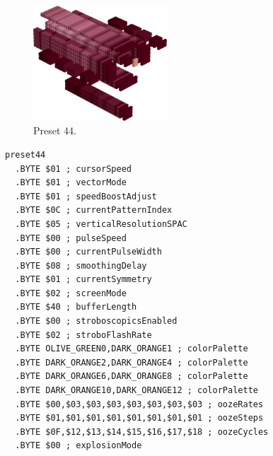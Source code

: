 \vspace*{-0.5cm}
\begin{minipage}[b]{0.48\linewidth}
\begin{figure}[H]                                                          
  \centering                                                             
  \begin{adjustbox}{width=5cm,center}                                   
  \includegraphics[width=5cm]{src/colorspace_presets/preset44-45.png}%
  \end{adjustbox}                                                        
\caption*{Preset 44.}                                           
\end{figure}                                                               
\end{minipage}
\hspace{0.1cm}
\begin{minipage}[b]{0.48\linewidth}                                                                         
\begin{lstlisting}[basicstyle=\ttfamily\tiny]
preset44
  .BYTE $01 ; cursorSpeed
  .BYTE $01 ; vectorMode
  .BYTE $01 ; speedBoostAdjust
  .BYTE $0C ; currentPatternIndex
  .BYTE $05 ; verticalResolutionSPAC
  .BYTE $00 ; pulseSpeed
  .BYTE $00 ; currentPulseWidth
  .BYTE $08 ; smoothingDelay
  .BYTE $01 ; currentSymmetry
  .BYTE $02 ; screenMode
  .BYTE $40 ; bufferLength
  .BYTE $00 ; stroboscopicsEnabled
  .BYTE $02 ; stroboFlashRate
  .BYTE OLIVE_GREEN0,DARK_ORANGE1 ; colorPalette
  .BYTE DARK_ORANGE2,DARK_ORANGE4 ; colorPalette
  .BYTE DARK_ORANGE6,DARK_ORANGE8 ; colorPalette
  .BYTE DARK_ORANGE10,DARK_ORANGE12 ; colorPalette
  .BYTE $00,$03,$03,$03,$03,$03,$03,$03 ; oozeRates
  .BYTE $01,$01,$01,$01,$01,$01,$01,$01 ; oozeSteps
  .BYTE $0F,$12,$13,$14,$15,$16,$17,$18 ; oozeCycles
  .BYTE $00 ; explosionMode
\end{lstlisting}
\end{minipage}


